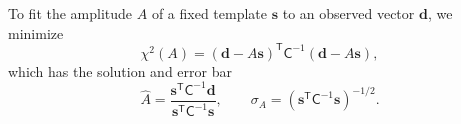 \documentclass[preprint]{aastex701}
\begin{document}
To fit the amplitude $A$ of a fixed template $\mathbf{s}$ to an observed
vector $\mathbf{d}$, we minimize
\begin{equation}
  \chi^{2}(A) =(\mathbf{d}-A\mathbf{s})^{\mathsf T}\mathsf{C}^{-1}
                 (\mathbf{d}-A\mathbf{s}), 
\end{equation}
which has the solution and error bar
\begin{equation}
  \hat A =\frac{\mathbf{s}^{\mathsf T}\mathsf{C}^{-1}\mathbf{d}}
                 {\mathbf{s}^{\mathsf T}\mathsf{C}^{-1}\mathbf{s}}, \qquad
  \sigma_{A}=\left(\mathbf{s}^{\mathsf T}\mathsf{C}^{-1}\mathbf{s}\right)^{-1/2}.
  \label{eq:amplitude}
\end{equation}
\end{document}
